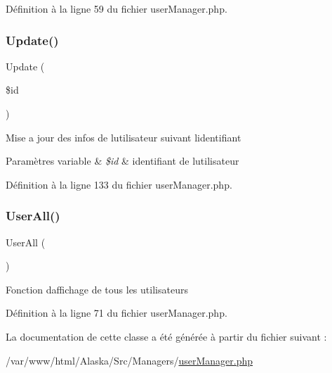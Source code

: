 Définition à la ligne 59 du fichier user\+Manager.\+php.

\mbox{\label{class_src_1_1_managers_1_1user_manager_a82232b33fbfacdbdb8a8f49acaecf564}} 
\subsubsection{\texorpdfstring{Update()}{Update()}}
{\footnotesize\ttfamily Update (\begin{DoxyParamCaption}\item[{}]{\$id }\end{DoxyParamCaption})}

Mise a jour des infos de l\textquotesingle{}utilisateur suivant l\textquotesingle{}identifiant 
\begin{DoxyParams}[1]{Paramètres}
variable & {\em \$id} & identifiant de l\textquotesingle{}utilisateur \\
\hline
\end{DoxyParams}


Définition à la ligne 133 du fichier user\+Manager.\+php.

\mbox{\label{class_src_1_1_managers_1_1user_manager_a0a377befd1052a5f989fd915af31373b}} 
\subsubsection{\texorpdfstring{User\+All()}{UserAll()}}
{\footnotesize\ttfamily User\+All (\begin{DoxyParamCaption}{ }\end{DoxyParamCaption})}

Fonction d\textquotesingle{}affichage de tous les utilisateurs 

Définition à la ligne 71 du fichier user\+Manager.\+php.



La documentation de cette classe a été générée à partir du fichier suivant \+:\begin{DoxyCompactItemize}
\item 
/var/www/html/\+Alaska/\+Src/\+Managers/\hyperlink{user_manager_8php}{user\+Manager.\+php}\end{DoxyCompactItemize}

